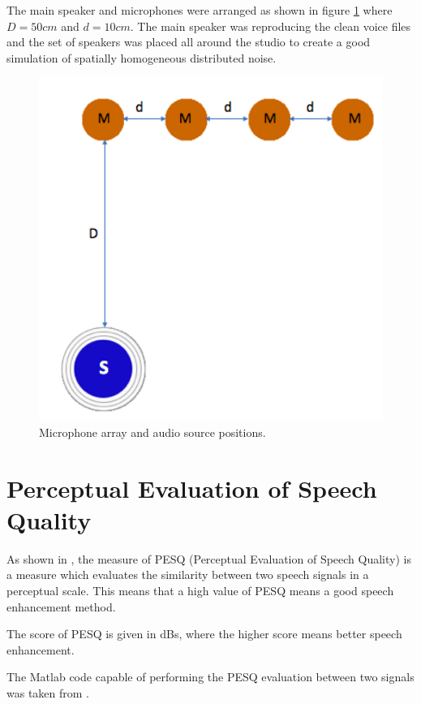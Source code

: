 The main speaker and microphones were arranged as shown in figure \ref{fig:DataB} where $D=50cm$ and $d=10cm$. The main speaker was reproducing the clean voice files and the set of speakers was placed all around the studio to create a good simulation of  spatially homogeneous distributed noise.



\begin{figure}[!ht]
  \centering
	\includegraphics[width=120mm]{Kap4/DataB}
	\caption{Microphone array and audio source positions.}
	\label{fig:DataB}
\end{figure}

\section{Perceptual Evaluation of Speech Quality}

As shown in \cite{Sharma2014AMeasure}, the measure of PESQ (Perceptual Evaluation of Speech Quality) is a measure which evaluates the similarity between two speech signals in a perceptual scale. This means that a high value of PESQ means a good speech enhancement method.

The score of PESQ is given in dBs, where the higher score means better speech enhancement.

The Matlab code capable of performing the PESQ evaluation between two signals was taken from \cite{Loizou}. 

